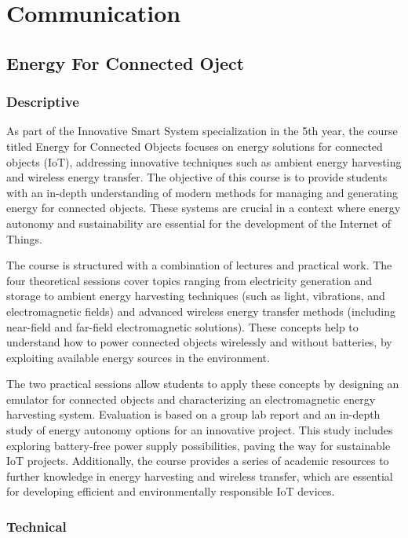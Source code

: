 \chapter{Communication}

\section{Energy For Connected Oject}

\subsection{Descriptive}

As part of the Innovative Smart System specialization in the 5th year, the course titled Energy for Connected Objects focuses on energy solutions for connected objects (IoT), addressing innovative techniques such as ambient energy harvesting and wireless energy transfer. The objective of this course is to provide students with an in-depth understanding of modern methods for managing and generating energy for connected objects. These systems are crucial in a context where energy autonomy and sustainability are essential for the development of the Internet of Things.

The course is structured with a combination of lectures and practical work. The four theoretical sessions cover topics ranging from electricity generation and storage to ambient energy harvesting techniques (such as light, vibrations, and electromagnetic fields) and advanced wireless energy transfer methods (including near-field and far-field electromagnetic solutions). These concepts help to understand how to power connected objects wirelessly and without batteries, by exploiting available energy sources in the environment.

The two practical sessions allow students to apply these concepts by designing an emulator for connected objects and characterizing an electromagnetic energy harvesting system. Evaluation is based on a group lab report and an in-depth study of energy autonomy options for an innovative project. This study includes exploring battery-free power supply possibilities, paving the way for sustainable IoT projects. Additionally, the course provides a series of academic resources to further knowledge in energy harvesting and wireless transfer, which are essential for developing efficient and environmentally responsible IoT devices.


\subsection{Technical}

